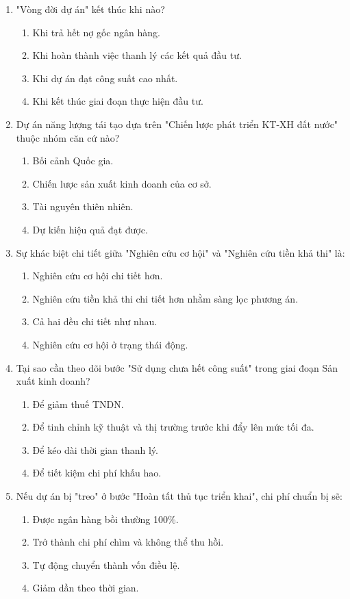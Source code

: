 \begin{enumerate}[label=\textbf{Câu \arabic*:}, leftmargin=*]
\item "Vòng đời dự án" kết thúc khi nào?
\begin{enumerate}[label=\Alph*.]
    \item Khi trả hết nợ gốc ngân hàng.
    \item Khi hoàn thành việc thanh lý các kết quả đầu tư.
    \item Khi dự án đạt công suất cao nhất.
    \item Khi kết thúc giai đoạn thực hiện đầu tư.
\end{enumerate}

\item Dự án năng lượng tái tạo dựa trên "Chiến lược phát triển KT-XH đất nước" thuộc nhóm căn cứ nào?
\begin{enumerate}[label=\Alph*.]
    \item Bối cảnh Quốc gia.
    \item Chiến lược sản xuất kinh doanh của cơ sở.
    \item Tài nguyên thiên nhiên.
    \item Dự kiến hiệu quả đạt được.
\end{enumerate}

\item Sự khác biệt chi tiết giữa "Nghiên cứu cơ hội" và "Nghiên cứu tiền khả thi" là:
\begin{enumerate}[label=\Alph*.]
    \item Nghiên cứu cơ hội chi tiết hơn.
    \item Nghiên cứu tiền khả thi chi tiết hơn nhằm sàng lọc phương án.
    \item Cả hai đều chi tiết như nhau.
    \item Nghiên cứu cơ hội ở trạng thái động.
\end{enumerate}

\item Tại sao cần theo dõi bước "Sử dụng chưa hết công suất" trong giai đoạn Sản xuất kinh doanh?
\begin{enumerate}[label=\Alph*.]
    \item Để giảm thuế TNDN.
    \item Để tinh chỉnh kỹ thuật và thị trường trước khi đẩy lên mức tối đa.
    \item Để kéo dài thời gian thanh lý.
    \item Để tiết kiệm chi phí khấu hao.
\end{enumerate}

\item Nếu dự án bị "treo" ở bước "Hoàn tất thủ tục triển khai", chi phí chuẩn bị sẽ:
\begin{enumerate}[label=\Alph*.]
    \item Được ngân hàng bồi thường 100\%.
    \item Trở thành chi phí chìm và không thể thu hồi.
    \item Tự động chuyển thành vốn điều lệ.
    \item Giảm dần theo thời gian.
\end{enumerate}

\end{enumerate}

